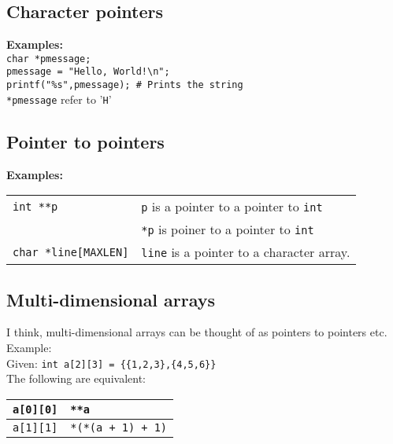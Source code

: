 \subsection{Character pointers}

\textbf{Examples:}\\

\texttt{char *pmessage;}\\
\texttt{pmessage = "Hello, World!\textbackslash n";} \\
\texttt{printf("\%s",pmessage); \# Prints the string}\\
\texttt{*pmessage} refer to '\texttt{H}'\\

\subsection{Pointer to pointers}

\textbf{Examples:}\\

\begin{tabularx}{\linewidth}{l|X}
\texttt{int **p} & \texttt{p} is a pointer to a pointer to \texttt{int}\\
& \texttt{*p} is poiner to a pointer to \texttt{int}\\
\texttt{char *line[MAXLEN]} & \texttt{line} is a pointer to a character array.\\

\end{tabularx}

\subsection{Multi-dimensional arrays}

I think, multi-dimensional arrays can be thought of as pointers to pointers etc.\\

Example:\\
Given: \texttt{int a[2][3] = \{\{1,2,3\},\{4,5,6\}\} } \\
The following are equivalent:\\

\begin{tabular}{l|l}
\hline
\texttt{a[0][0]} & \texttt{**a}\\
\hline
\texttt{a[1][1]} & \texttt{*(*(a + 1) + 1)}\\ 
\hline
\end{tabular}

\hspace{10pt}\\

